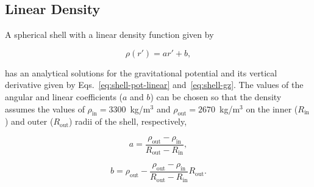 \documentclass[extra, referee]{gji}
\begin{document}
\subsection{Linear Density}

A spherical shell with a linear density function given by

\begin{equation}
    \rho(r') = ar' + b,
    \label{eq:density-linear}
\end{equation}

\noindent
has an analytical solutions for the gravitational potential and its vertical derivative
given by Eqs.~\ref{eq:shell-pot-linear} and~\ref{eq:shell-gz}.
The values of the angular and linear coefficients ($a$ and $b$)
can be chosen so that the density assumes the values of $\rho_\text{in} = 3300$~kg/m$^3$
and $\rho_\text{out} = 2670$~kg/m$^3$ on the inner ($R_\text{in}$) and outer
($R_\text{out}$) radii of the shell, respectively,

\begin{equation}
    a = \frac{\rho_\text{out} - \rho_\text{in}}{R_\text{out} - R_\text{in}},
\end{equation}

\begin{equation}
    b = \rho_\text{out} -
    \frac{\rho_\text{out} - \rho_\text{in}}{R_\text{out} - R_\text{in}} R_\text{out}.
\end{equation}
\end{document}
